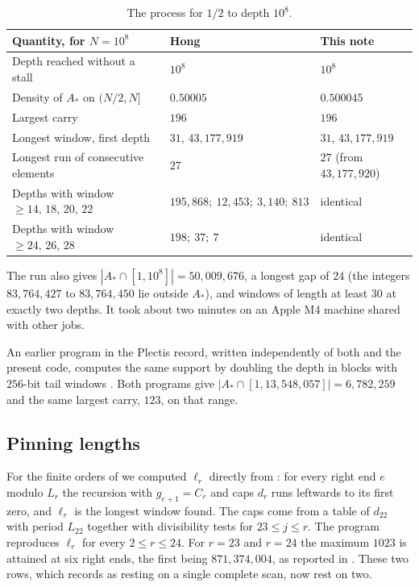 \documentclass[11pt]{amsart}
\begin{document}
\begin{table}[ht]
\centering
\begin{tabular}{@{}lll@{}}
\toprule
Quantity, for $N=10^8$ & Hong \cite{hong} & This note\\
\midrule
Depth reached without a stall & $10^8$ & $10^8$\\
Density of $A_*$ on $(N/2,N]$ & $0.50005$ & $0.500045$\\
Largest carry & $196$ & $196$\\
Longest window, first depth & $31$, $43{,}177{,}919$ & $31$, $43{,}177{,}919$\\
Longest run of consecutive elements & $27$ & $27$ (from $43{,}177{,}920$)\\
Depths with window $\ge14,\,18,\,20,\,22$ & $195{,}868;\ 12{,}453;\ 3{,}140;\ 813$ & identical\\
Depths with window $\ge24,\,26,\,28$ & $198;\ 37;\ 7$ & identical\\
\bottomrule
\end{tabular}
\medskip
\caption{The process for $1/2$ to depth $10^8$.}\label{tab:repro}
\end{table}

The run also gives $|A_*\cap[1,10^8]|=50{,}009{,}676$, a longest gap of $24$
(the integers $83{,}764{,}427$ to $83{,}764{,}450$ lie outside $A_*$), and
windows of length at least $30$ at exactly two depths. It took about two
minutes on an Apple M4 machine shared with other jobs.

An earlier program in the Plectis record, written independently of both
\cite{hong} and the present code, computes the same support by doubling the
depth in blocks with $256$-bit tail windows \cite{cookrecord}. Both programs
give $|A_*\cap[1,13{,}548{,}057]|=6{,}782{,}259$ and the same largest carry,
$123$, on that range.

\subsection*{Pinning lengths}
For the finite orders of \cite[Table~2]{hong} we computed $\ell_r$ directly
from \cite[Lemma~3.4]{hong}: for every right end $e$ modulo $L_r$ the recursion
with $g_{e+1}=C_r$ and caps $d_r$ runs leftwards to its first zero, and $\ell_r$
is the longest window found. The caps come from a table of $d_{22}$ with
period $L_{22}$ together with divisibility tests for $23\le j\le r$. The
program reproduces $\ell_r$ for every $2\le r\le24$. For $r=23$ and $r=24$ the
maximum $1023$ is attained at six right ends, the first being
$871{,}374{,}004$, as reported in \cite[\S5.1]{hong}. These two rows, which
\cite{hong} records as resting on a single complete scan, now rest on two.
\end{document}

